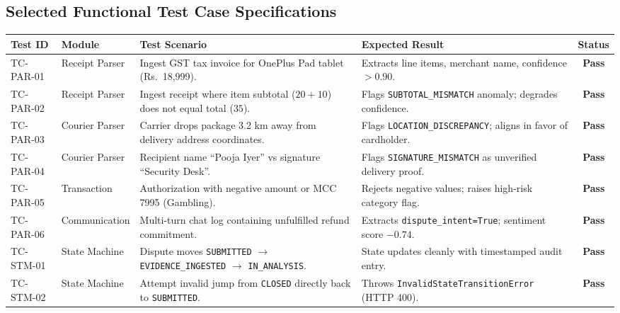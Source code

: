 \documentclass[11pt,a4paper]{article}
\begin{document}
\subsection{Selected Functional Test Case Specifications}

\begin{longtable}{p{2.0cm} p{2.8cm} p{4.2cm} p{4.2cm} c}
\toprule
\textbf{Test ID} & \textbf{Module} & \textbf{Test Scenario} & \textbf{Expected Result} & \textbf{Status} \\
\midrule
\endhead

TC-PAR-01 & Receipt Parser & Ingest GST tax invoice for OnePlus Pad tablet (Rs.\ 18,999). & Extracts line items, merchant name, confidence $> 0.90$. & \textbf{Pass} \\

TC-PAR-02 & Receipt Parser & Ingest receipt where item subtotal ($20+10$) does not equal total ($35$). & Flags \texttt{SUBTOTAL\_MISMATCH} anomaly; degrades confidence. & \textbf{Pass} \\

TC-PAR-03 & Courier Parser & Carrier drops package 3.2 km away from delivery address coordinates. & Flags \texttt{LOCATION\_DISCREPANCY}; aligns in favor of cardholder. & \textbf{Pass} \\

TC-PAR-04 & Courier Parser & Recipient name ``Pooja Iyer'' vs signature ``Security Desk''. & Flags \texttt{SIGNATURE\_MISMATCH} as unverified delivery proof. & \textbf{Pass} \\

TC-PAR-05 & Transaction & Authorization with negative amount or MCC 7995 (Gambling). & Rejects negative values; raises high-risk category flag. & \textbf{Pass} \\

TC-PAR-06 & Communication & Multi-turn chat log containing unfulfilled refund commitment. & Extracts \texttt{dispute\_intent=True}; sentiment score $-0.74$. & \textbf{Pass} \\

TC-STM-01 & State Machine & Dispute moves \texttt{SUBMITTED} $\rightarrow$ \texttt{EVIDENCE\_INGESTED} $\rightarrow$ \texttt{IN\_ANALYSIS}. & State updates cleanly with timestamped audit entry. & \textbf{Pass} \\

TC-STM-02 & State Machine & Attempt invalid jump from \texttt{CLOSED} directly back to \texttt{SUBMITTED}. & Throws \texttt{InvalidStateTransitionError} (HTTP 400). & \textbf{Pass} \\


\end{longtable}
\end{document}
